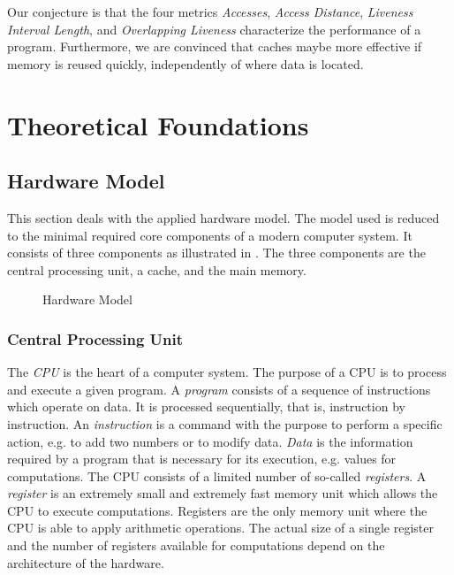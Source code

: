 \documentclass[onecolumn, openright, master, english, signatures]{dbrgrptt}
\begin{document}
Our conjecture is that the four metrics \emph{Accesses}, \emph{Access Distance}, \emph{Liveness Interval Length}, and \emph{Overlapping Liveness} characterize the performance of a program.
Furthermore, we are convinced that caches maybe more effective if memory is reused quickly, independently of where data is located.



\chapter{Theoretical Foundations}\label{cha:theoretical-foundations}


\section{Hardware Model}\label{sec:hardware-model}

This section deals with the applied hardware model. The model used is reduced to the minimal required core components of a modern computer system. It consists of three components as illustrated in . The three components are the central processing unit, a cache, and the main memory.

\begin{figure}[!ht]
  \centering
  
  \caption{Hardware Model}
  \label{fig:hardware-model}
\end{figure}

\subsection{Central Processing Unit}
The \emph{\ac{CPU}} is the heart of a computer system. The purpose of a \ac{CPU} is to process and execute a given program. A \emph{program} consists of a sequence of instructions which operate on data. It is processed sequentially, that is, instruction by instruction. An \emph{instruction} is a command with the purpose to perform a specific action, e.g. to add two numbers or to modify data. \emph{Data} is the information required by a program that is necessary for its execution, e.g. values for computations. The \ac{CPU} consists of a limited number of so-called \emph{registers}. A \emph{register} is an extremely small and extremely fast memory unit which allows the \ac{CPU} to execute computations. Registers are the only memory unit where the \ac{CPU} is able to apply arithmetic operations. The actual size of a single register and the number of registers available for computations depend on the architecture of the hardware.
\end{document}
